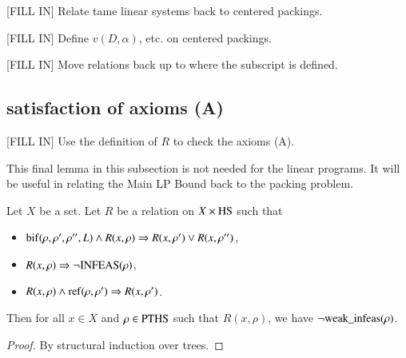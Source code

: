 [FILL IN]  Relate tame linear systems back to centered packings.

[FILL IN] Define $v(D,\alpha)$, etc. on centered packings.

[FILL IN] Move relations back up to where the subscript is
defined.

\subsection{satisfaction of axioms (A)}

[FILL IN]  Use the definition of $R$ to check the axioms (A).



This final lemma in this subsection is not needed for the linear
programs. It will be useful in relating the Main LP Bound back to
the packing problem.

\begin{lemma}  Let $X$ be a set.  Let $R$ be a relation on
$X\times {\operatorname{HS}}$ such that
    \begin{itemize}
    \item ${\operatorname{bif}}(\rho,\rho',\rho'',L) \wedge R(x,\rho)\Rightarrow
      R(x,\rho') \vee R(x,\rho'')$,
    \item $R(x,\rho) \Rightarrow \neg {\operatorname{INFEAS}}(\rho)$,
    \item $R(x,\rho) \wedge {\operatorname{ref}}(\rho,\rho') \Rightarrow
    R(x,\rho')$.
    \end{itemize}
Then for all $x\in X$ and $\rho\in{\operatorname{PTHS}}$ such that
$R(x,\rho)$, we have $\neg {\operatorname{weak\_infeas}}(\rho)$.
\end{lemma}

\begin{proof} By structural induction over trees.
\end{proof}
